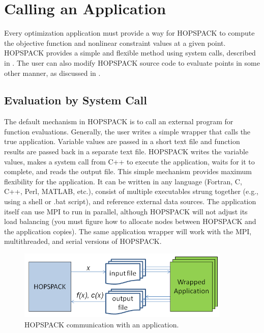 \clearpage
\section{Calling an Application}
\label{sec:calleval}

Every optimization application must provide a way for HOPSPACK to compute the
objective function and nonlinear constraint values at a given point.
HOPSPACK provides a simple and flexible method using system calls, described
in .
The user can also modify HOPSPACK source code to evaluate points in some
other manner, as discussed in .


\subsection{Evaluation by System Call}
\label{subcalleval:systemcall}

The default mechanism in HOPSPACK is to call an external program for
function evaluations.  Generally, the user writes
a simple wrapper that calls the true application.
Variable values are passed in a short text file and function
results are passed back in a separate text file.  HOPSPACK writes the variable
values, makes a system call from C++ to execute the application,
waits for it to complete, and reads the output file.
This simple mechanism provides maximum flexibility for the application.
It can be written in any language (Fortran, C, C++, Perl, MATLAB, etc.),
consist of multiple executables strung together (e.g., using
a shell or .bat script),
and reference external data sources.
The application itself can use MPI to run in parallel, although HOPSPACK
will not adjust its load balancing (you must figure how to allocate nodes
between HOPSPACK and the application copies).
The same application wrapper will work with the MPI, multithreaded, and serial
versions of HOPSPACK.

\begin{figure}[!h]
  \begin{center}
    \includegraphics[width=4.0in]{EvalDiagramClipped.png}
    \vspace{-5mm}
  \caption{HOPSPACK communication with an application.}
  \label{fig:callforeval}
  \end{center}
\end{figure}


